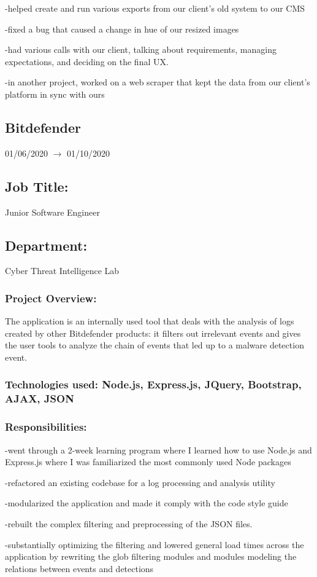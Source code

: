 \documentclass[a4paper,hidelinks,11pt]{article}
\begin{document}
-helped create and run various exports from our client's old system to our CMS

-fixed a bug that caused a change in hue of our resized images

-had various calls with our client, talking about requirements, managing expectations, and deciding on the final UX.

-in another project, worked on a web scraper that kept the data from our client's platform in sync with ours


\subsection{Bitdefender} 01/06/2020 $\rightarrow$ 01/10/2020
\subsection{Job Title:} Junior Software Engineer
\subsection{Department:} Cyber Threat Intelligence Lab
\subsubsection{Project Overview:}
The application is an internally used tool that deals with the analysis of logs created by other Bitdefender products: it filters out irrelevant events and gives the user tools to analyze the chain of events that led up to a malware detection event.
\subsubsection{Technologies used: Node.js, Express.js, JQuery, Bootstrap, AJAX, JSON}
\subsubsection{Responsibilities:}
-went through a 2-week learning program where I learned how to use Node.js and Express.js where I was familiarized the most commonly used Node packages

-refactored an existing codebase for a log processing and analysis utility

-modularized the application and made it comply with the code style guide

-rebuilt the complex filtering and preprocessing of the JSON files.

-substantially optimizing the filtering and lowered general load times across the application by rewriting the glob filtering modules and modules modeling the relations between events and detections
\end{document}
